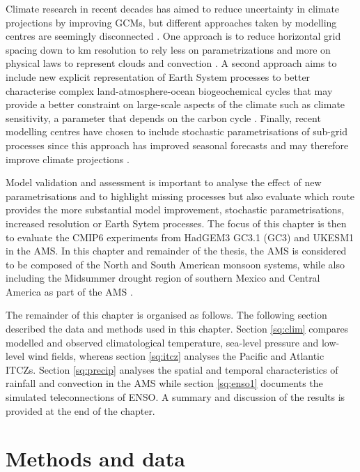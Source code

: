 Climate research in recent decades has aimed to reduce uncertainty in climate projections by improving GCMs, but different approaches taken by modelling centres are seemingly disconnected \citep{jakob2014}. One approach is to reduce horizontal grid spacing down to km resolution to rely less on parametrizations and more on physical laws to represent clouds and convection \citep{palmer2019}. A second approach aims to include new explicit representation of Earth System processes to better characterise complex land-atmosphere-ocean biogeochemical cycles that may provide a better constraint on large-scale aspects of the climate such as climate sensitivity, a parameter that depends on the carbon cycle \citep{marotzke2017,sellar2019,andrews2019}. Finally, recent modelling centres have chosen to include  stochastic  parametrisations of sub-grid processes since this approach has improved seasonal forecasts and may therefore improve climate projections \citep{palmer2019st}. 

Model validation and assessment is important to analyse the effect of new parametrisations and to highlight missing processes but also evaluate which route provides the more substantial model improvement, stochastic parametrisations, increased resolution or Earth Sytem processes.
The focus of this chapter is then to evaluate the CMIP6 experiments from HadGEM3 GC3.1 (GC3) and UKESM1 in the AMS. In this chapter and remainder of the thesis, the AMS is considered to be composed of the North and South American monsoon systems, while also including the Midsummer drought region of southern Mexico and Central America as part of the AMS \citep[as in e.g.][]{vera2006,pascale2019}.

The remainder of this chapter is organised as follows. The following section described the data and methods used in this chapter. Section  \ref{sq:clim} compares modelled and observed climatological temperature, sea-level pressure and low-level wind fields,  whereas section \ref{sq:itcz} analyses the Pacific and Atlantic ITCZs. Section \ref{sq:precip} analyses the spatial and temporal characteristics of rainfall and convection in the AMS while section \ref{sq:enso1} documents the simulated teleconnections of ENSO. A summary and discussion of the results is provided at the end of the chapter.

\section{Methods and data} 

